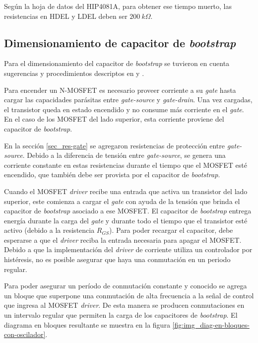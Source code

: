 \noindent Según la hoja de datos del HIP4081A, para obtener ese tiempo muerto, las resistencias en HDEL y LDEL deben ser $200\:k\Omega$.

\subsection{Dimensionamiento de capacitor de \textsl{bootstrap}}\label{sec_cap_bootstrap}

\noindent Para el dimensionamiento del capacitor de \textsl{bootstrap} se tuvieron en cuenta sugerencias y procedimientos descriptos en \cite{HIP4081A_AN9405} y \cite{HIP4081A_FN3659}.

Para encender un N-MOSFET es necesario proveer corriente a su \textsl{gate} hasta cargar las capacidades parásitas entre \textsl{gate-source} y \textsl{gate-drain}. Una vez cargadas, el transistor queda en estado encendido y no consume más corriente en el \textsl{gate}. En el caso de los MOSFET del lado superior, esta corriente proviene del capacitor de \textsl{bootstrap}.

En la sección \ref{sec_res-gate} se agregaron resistencias de protección entre \textsl{gate-source}. Debido a la diferencia de tensión entre \textsl{gate-source}, se genera una corriente constante en estas resistencias durante el tiempo que el MOSFET esté encendido, que también debe ser provista por el capacitor de \textsl{bootstrap}.

\noindent Cuando el MOSFET \textsl{driver} recibe una entrada que activa un transistor del lado superior, este comienza a cargar el \textsl{gate} con ayuda de la tensión que brinda el capacitor de \textsl{bootstrap} asociado a ese MOSFET. El capacitor de \textsl{bootstrap} entrega energía durante la carga del \textsl{gate} y durante todo el tiempo que el transistor esté activo (debido a la resistencia $R_{GS}$). Para poder recargar el capacitor, debe esperarse a que el \textsl{driver} reciba la entrada necesaria para apagar el MOSFET. Debido a que la implementación del \textsl{driver} de corriente utiliza un controlador por histéresis, no es posible asegurar que haya una conmutación en un periodo regular.

\noindent Para poder asegurar un período de conmutación constante y conocido se agrega un bloque que superpone una conmutación de alta frecuencia a la señal de control que ingresa al MOSFET \textsl{driver}. De esta manera se producen conmutaciones en un intervalo regular que permiten la carga de los capacitores de \textsl{bootstrap}. El diagrama en bloques resultante se muestra en la figura \ref{fig:img_diag-en-bloques-con-oscilador}. 

